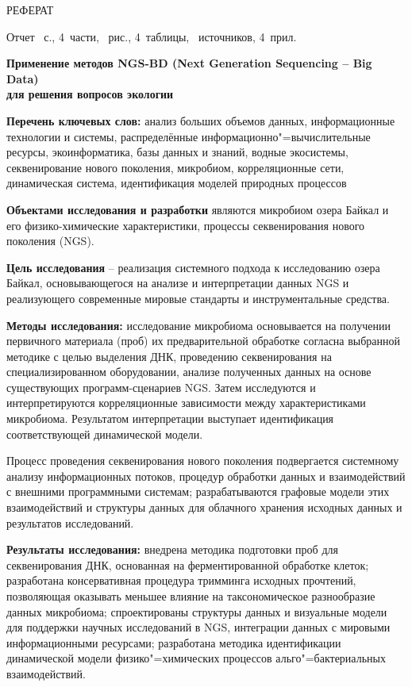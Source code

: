 \documentclass[a4paper,12pt,openany,final]{extreport}
\begin{document}
\begin{titlepage}
  \thispagestyle{empty}
  \begin{center}
    {\capfont РЕФЕРАТ}
  \end{center}

Отчет \pageref{LastPage}~с., 4~части, ~рис., 4~таблицы, ~источников, 4~прил.
\begin{center}
\textbf{Применение методов NGS-BD (Next Generation Sequencing -- Big Data)\\ для решения вопросов экологии}
\end{center}

\newcommand\RAZ[1]{{\bfseries #1}}

\RAZ{Перечень ключевых слов:} анализ больших объемов данных, информационные технологии и системы, распределённые информационно"=вычислительные ресурсы, экоинформатика, базы данных и знаний, водные экосистемы, секвенирование нового поколения, микробиом, корреляционные сети, динамическая система, идентификация моделей природных процессов

\RAZ{Объектами исследования и разработки} являются микробиом озера Байкал и его физико-химические характеристики, процессы секвенирования нового поколения (NGS).

\RAZ{Цель исследования} -- реализация системного подхода к исследованию озера Байкал, основывающегося на анализе и интерпретации данных NGS и реализующего современные мировые стандарты и инструментальные средства.

\RAZ{Методы исследования:} исследование микробиома основывается на получении первичного материала (проб) их предварительной обработке согласна выбранной методике с целью выделения ДНК, проведению секвенирования на специализированном оборудовании, анализе полученных данных на основе существующих программ-сценариев NGS. Затем исследуются и интерпретируются корреляционные зависимости между характеристиками микробиома. Результатом интерпретации выступает идентификация соответствующей динамической модели.

Процесс проведения секвенирования нового поколения подвергается системному анализу информационных потоков, процедур обработки данных и взаимодействий с внешними программными системам; разрабатываются графовые модели этих взаимодействий и структуры данных для облачного хранения исходных данных и результатов исследований.

\RAZ{Результаты исследования:} внедрена методика подготовки проб для секвенирования ДНК, основанная на ферментированной обработке клеток; разработана консервативная процедура тримминга исходных прочтений, позволяющая оказывать меньшее влияние на таксономическое разнообразие данных микробиома; спроектированы структуры данных и визуальные модели для поддержки научных исследований в NGS, интеграции данных с мировыми информационными ресурсами; разработана методика идентификации динамической модели физико"=химических процессов альго"=бактериальных взаимодействий.


\end{titlepage}
\end{document}
